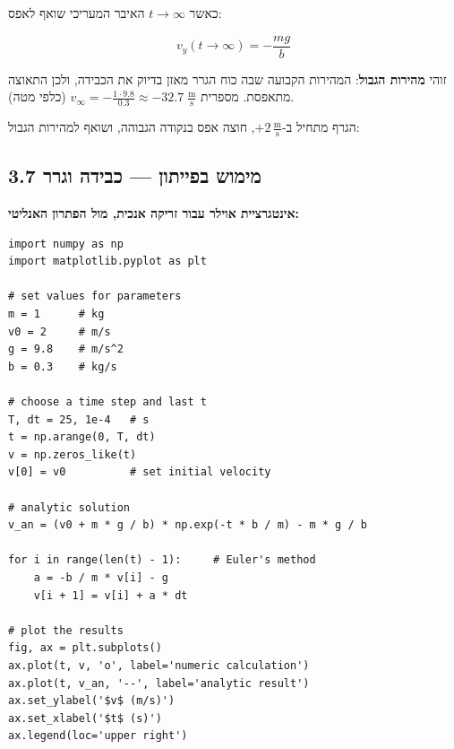 \documentclass[12pt, a4paper]{article}
\begin{document}
כאשר \textenglish{$t\to\infty$} האיבר המעריכי שואף לאפס:

\begin{tcolorbox}[resultbox]
\[
  v_y(t\to\infty) = -\frac{mg}{b}
\]
\end{tcolorbox}

\begin{tcolorbox}[notebox]
זוהי \textbf{מהירות הגבול}: המהירות הקבועה שבה כוח הגרר מאזן בדיוק את הכבידה, ולכן התאוצה מתאפסת. מספרית \textenglish{$v_\infty = -\tfrac{1\cdot 9.8}{0.3} \approx -32.7\;\tfrac{\text{m}}{\text{s}}$} (כלפי מטה).
\end{tcolorbox}

הגרף מתחיל ב-\textenglish{$+2\,\tfrac{\text{m}}{\text{s}}$}, חוצה אפס בנקודה הגבוהה, ושואף למהירות הגבול:

\begin{center}
\end{center}

\subsection*{3.7 מימוש בפייתון --- כבידה וגרר}

\noindent\textbf{אינטגרציית אוילר עבור זריקה אנכית, מול הפתרון האנליטי:}

\begin{LTR}
\begin{lstlisting}[style=pycode]
import numpy as np
import matplotlib.pyplot as plt

# set values for parameters
m = 1      # kg
v0 = 2     # m/s
g = 9.8    # m/s^2
b = 0.3    # kg/s

# choose a time step and last t
T, dt = 25, 1e-4   # s
t = np.arange(0, T, dt)
v = np.zeros_like(t)
v[0] = v0          # set initial velocity

# analytic solution
v_an = (v0 + m * g / b) * np.exp(-t * b / m) - m * g / b

for i in range(len(t) - 1):     # Euler's method
    a = -b / m * v[i] - g
    v[i + 1] = v[i] + a * dt

# plot the results
fig, ax = plt.subplots()
ax.plot(t, v, 'o', label='numeric calculation')
ax.plot(t, v_an, '--', label='analytic result')
ax.set_ylabel('$v$ (m/s)')
ax.set_xlabel('$t$ (s)')
ax.legend(loc='upper right')
\end{lstlisting}
\end{LTR}
\end{document}
